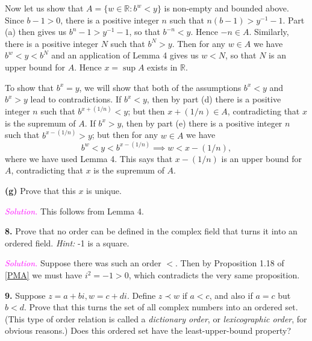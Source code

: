 \documentclass[12pt]{article}
\newcommand{\newp}{\vspace{5mm}}
\theoremstyle{definition}
\begin{document}
Now let us show that \( A = \{ w \in \mathbb{R} : b^w < y \} \) is non-empty and bounded above. Since \( b - 1 > 0 \), there is a positive integer \( n \) such that \( n(b - 1) > y^{-1} - 1 \). Part (a) then gives us \( b^n - 1 > y^{-1} - 1 \), so that \( b^{-n} < y \). Hence \( -n \in A \). Similarly, there is a positive integer \( N \) such that \( b^N > y \). Then for any \( w \in A \) we have \( b^w < y < b^N \) and an application of Lemma 4 gives us \( w < N \), so that \( N \) is an upper bound for \( A \). Hence \( x = \sup A \) exists in \( \mathbb{R} \).

\newp

To show that \( b^x = y \), we will show that both of the assumptions \( b^x < y \) and \( b^x > y \) lead to contradictions. If \( b^x < y \), then by part (d) there is a positive integer \( n \) such that \( b^{x + (1/n)} < y \); but then \( x + (1/n) \in A \), contradicting that \( x \) is the supremum of \( A \). If \( b^x > y \), then by part (e) there is a positive integer \( n \) such that \( b^{x - (1/n)} > y \); but then for any \( w \in A \) we have
\[
    b^w < y < b^{x - (1/n)} \implies w < x - (1/n),
\]
where we have used Lemma 4. This says that \( x - (1/n) \) is an upper bound for \( A \), contradicting that \( x \) is the supremum of \( A \).

\newp

\textbf{(g)} Prove that this \( x \) is unique.

\newp

\textit{\textcolor{magenta}{Solution.}} This follows from Lemma 4.

\newp

\textbf{8.} Prove that no order can be defined in the complex field that turns it into an ordered field. \textit{Hint:} -1 is a square.

\newp

\textit{\textcolor{magenta}{Solution.}} Suppose there was such an order \( < \). Then by Proposition 1.18 of \hyperlink{pma}{[PMA]} we must have \( i^2 = -1 > 0 \), which contradicts the very same proposition.

\newp

\textbf{9.} Suppose \( z = a + bi, w = c + di \). Define \( z \prec w \) if \( a < c \), and also if \( a = c \) but \( b < d \). Prove that this turns the set of all complex numbers into an ordered set. (This type of order relation is called a \textit{dictionary order}, or \textit{lexicographic order}, for obvious reasons.) Does this ordered set have the least-upper-bound property?
\end{document}
